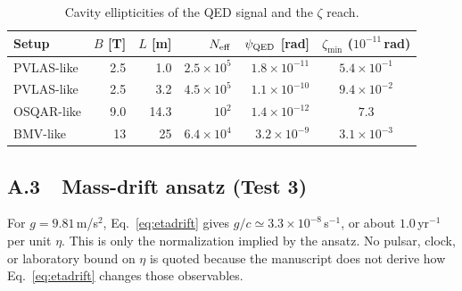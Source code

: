 \documentclass[11pt,a4paper]{article}
\begin{document}
\begin{table}[htbp]
\centering\small
\caption{Cavity ellipticities of the QED signal and the $\zeta$ reach.}
\begin{tabular}{@{}lrrrrc@{}}
\toprule
Setup & $B$ [T] & $L$ [m] & $N_{\rm eff}$ & $\psi_{\rm QED}$ [rad] & $\zeta_{\min}$ ($10^{-11}\,$rad)\\
\midrule
PVLAS-like  & 2.5 & 1.0 & $2.5\times10^{5}$ & $1.8\times10^{-11}$ & $5.4\times10^{-1}$ \\
PVLAS-like  & 2.5 & 3.2 & $4.5\times10^{5}$ & $1.1\times10^{-10}$ & $9.4\times10^{-2}$ \\
OSQAR-like  & 9.0 & 14.3 & $10^{2}$ & $1.4\times10^{-12}$ & $7.3$ \\
BMV-like    & 13  & 25 & $6.4\times10^{4}$ & $3.2\times10^{-9}$ & $3.1\times10^{-3}$ \\
\bottomrule
\end{tabular}
\end{table}

\subsection*{A.3\ \ Mass-drift ansatz (Test 3)}

For $g=9.81\,$m/s$^2$, Eq.~\eqref{eq:etadrift} gives
$g/c\simeq3.3\times10^{-8}\,$s$^{-1}$, or about $1.0\,$yr$^{-1}$ per unit $\eta$. This is only
the normalization implied by the ansatz. No pulsar, clock, or laboratory bound on $\eta$ is
quoted because the manuscript does not derive how Eq.~\eqref{eq:etadrift} changes those
observables.
\end{document}
